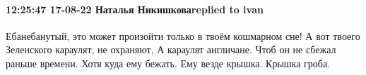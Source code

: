  
 
 
 
 

\paragraph{12:25:47 17-08-22 Наталья Никишковаreplied to ivan}

Ебанебанутый, это может произойти только в твоём кошмарном сне!
А вот твоего Зеленского караулят, не охраняют, А караулят англичане. Чтоб он не сбежал раньше времени.
Хотя куда ему бежать. Ему везде крышка. Крышка гроба.
